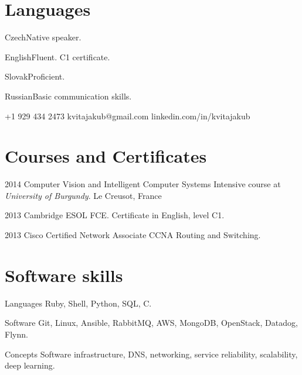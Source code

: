 \documentclass{tccv}
\begin{document}
\section{Languages}

\begin{factlist}
	\item{Czech}{Native speaker.}
	\item{English}{Fluent. C1 certificate.}
	\item{Slovak}{Proficient.}
	\item{Russian}{Basic communication skills.}
\end{factlist}

{+1 929 434 2473}
{kvitajakub@gmail.com}
{linkedin.com/in/kvitajakub}

\section{Courses and Certificates}

\begin{yearlist}
	
	\item{2014}
	{Computer Vision and Intelligent Computer Systems}
	{Intensive course at \emph{University of Burgundy}. Le Creusot, France}
	
	\item{2013}
	{Cambridge ESOL FCE.}
	{Certificate in English, level C1.}
	
	\item{2013}
	{Cisco Certified Network Associate}
	{CCNA Routing and Switching.}
	
	
\end{yearlist}

\section{Software skills}

\begin{factlist}
	
	\item{Languages}
	{Ruby, Shell, Python, SQL, C.}
	
	\item{Software}
	{Git, Linux, Ansible, RabbitMQ, AWS, MongoDB, OpenStack, Datadog, Flynn.}
	
	\item{Concepts}
	{Software infrastructure, DNS, networking, service reliability, scalability, deep learning.}
	
\end{factlist}
\end{document}
